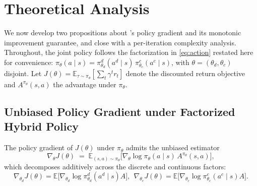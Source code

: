 \section{Theoretical Analysis}\label{sec:theory}

We now develop two propositions about \method's policy gradient and
its monotonic improvement guarantee, and close with a per-iteration
complexity analysis. Throughout, the joint policy follows the
factorization in \eqref{eq:action} restated here for convenience:
$\pi_{\theta}(a\mid s)=\pi^{d}_{\theta_{d}}(a^{d}\mid s)\,
\pi^{c}_{\theta_{c}}(a^{c}\mid s)$, with $\theta=(\theta_{d},\theta_{c})$
disjoint. Let $J(\theta)=\mathbb{E}_{\tau\sim\pi_{\theta}}[\sum_{t}\gamma^{t}r_{t}]$
denote the discounted return objective and $A^{\pi_{\theta}}(s,a)$ the
advantage under $\pi_{\theta}$.

\subsection{Unbiased Policy Gradient under Factorized Hybrid Policy}\label{subsec:grad}
\begin{proposition}\label{prop:grad}
The policy gradient of $J(\theta)$ under $\pi_{\theta}$ admits the
unbiased estimator
\begin{equation}
\nabla_{\theta}J(\theta)
\;=\;\mathbb{E}_{(s,a)\sim\pi_{\theta}}\!\big[\nabla_{\theta}\log\pi_{\theta}(a\mid s)\,
A^{\pi_{\theta}}(s,a)\big],
\label{eq:grad}
\end{equation}
which decomposes additively across the discrete and continuous factors:
\begin{equation}
\nabla_{\theta_{d}}J(\theta)\!=\!\mathbb{E}\!\big[\nabla_{\theta_{d}}\log\pi^{d}_{\theta_{d}}(a^{d}\!\mid\! s)A\big],\;\,
\nabla_{\theta_{c}}J(\theta)\!=\!\mathbb{E}\!\big[\nabla_{\theta_{c}}\log\pi^{c}_{\theta_{c}}(a^{c}\!\mid\! s)A\big].
\label{eq:gradfact}
\end{equation}
\end{proposition}

